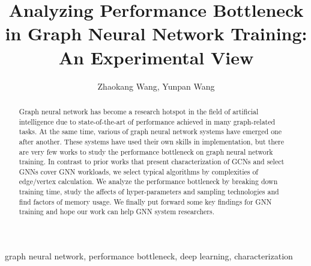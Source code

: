 \documentclass{elsarticle}
\begin{document}
\begin{frontmatter}

	\title{Analyzing Performance Bottleneck in Graph Neural Network Training: An Experimental View}
	\author{Zhaokang Wang, Yunpan Wang}%
	\address{State Key Laboratory for Novel Software Technology, \\Department of Computer Science and Technology, Nanjing University, \\Nanjing 210023, China}

	\begin{abstract}
		Graph neural network has become a research hotspot in the field of artificial intelligence due to state-of-the-art of performance
		achieved in many graph-related tasks. At the same time, various of graph neural network systems have emerged one after another.
		These systems have used their own skills in implementation, but there are very few works to study the performance bottleneck
		on graph neural network training. In contrast to prior works that present characterization of GCNs and select GNNs cover GNN workloads,
		we select typical algorithms by complexities of edge/vertex calculation. We analyze the performance bottleneck by breaking down training
		time, study the affects of hyper-parameters and sampling technologies and find factors of memory usage. We finally put forward some key
		findings for GNN training and hope our work can help GNN system researchers.
	\end{abstract}

	\begin{keyword}
		graph neural network, performance bottleneck, deep learning, characterization
	\end{keyword}

\end{frontmatter}

\linenumbers











\end{document}

